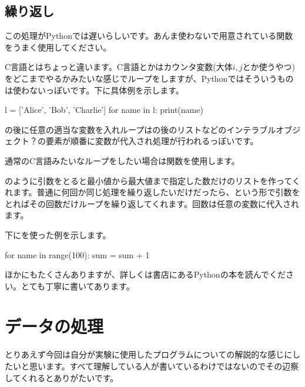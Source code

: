 \documentclass[11pt,b5paper,papersize,dvipdfmx]{jsbook}
\begin{document}
\subsection{繰り返し}
この処理がPythonでは遅いらしいです。あんま使わないで用意されている関数をうまく使用してください。\par
C言語とはちょっと違います。C言語とかはカウンタ変数(大体$i,j$とか使うやつ)をどこまでやるかみたいな感じでループをしますが、Pythonではそういうものは使わないっぽいです。下に具体例を示します。
\begin{kdncode-ii}
    l = ['Alice', 'Bob', 'Charlie']
    for name in l:
        print(name)
\end{kdncode-ii}
の後に任意の適当な変数を入れループはの後のリストなどのインテラブルオブジェクト？の要素が順番に変数が代入され処理が行われるっぽいです。\par
通常のC言語みたいなループをしたい場合は関数を使用します。\par
{}のように引数をとると最小値から最大値まで指定した数だけのリストを作ってくれます。普通に何回か同じ処理を繰り返したいだけだったら、という形で引数をとればその回数だけループを繰り返してくれます。回数は任意の変数に代入されます。\par
下にを使った例を示します。
\begin{kdncode-ii}
    for name in range(100):
        sum = sum + 1
\end{kdncode-ii}
\par\par
ほかにもたくさんありますが、詳しくは書店にあるPythonの本を読んでください。とても丁寧に書いてあります。
\section{データの処理}
とりあえず今回は自分が実験に使用したプログラムについての解説的な感じにしたいと思います。すべて理解している人が書いているわけではないのでその辺察してくれるとありがたいです。
\end{document}
